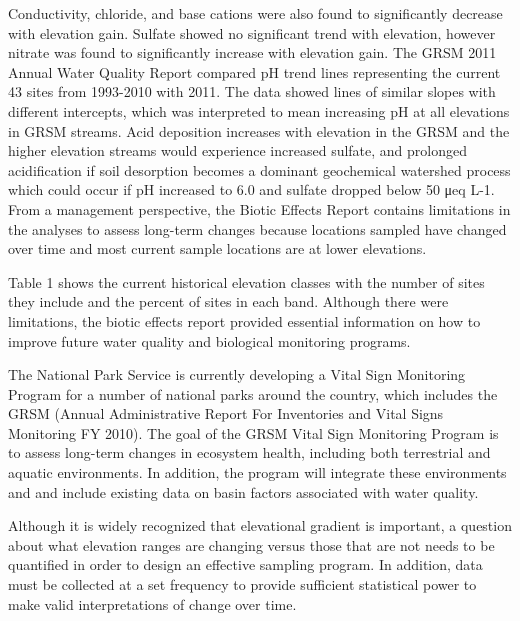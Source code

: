Conductivity, chloride, and base cations were also found to significantly decrease with elevation gain.  
Sulfate showed no significant trend with elevation, however nitrate was found to significantly increase with elevation gain.  
The GRSM 2011 Annual Water Quality Report compared pH trend lines representing the current 43 sites from 1993-2010 with 2011.  
The data showed lines of similar slopes with different intercepts, which was interpreted to mean increasing pH at all elevations in GRSM streams.  
Acid deposition increases with elevation in the GRSM and the higher elevation streams would experience increased sulfate, and prolonged acidification if soil desorption becomes a dominant geochemical watershed process which could occur if pH increased to 6.0 and sulfate dropped below 50 μeq L-1.  
From a management perspective, the Biotic Effects Report contains limitations in the analyses to assess long-term changes because locations sampled have changed over time and most current sample locations are at lower elevations.

%
Table 1 shows the current historical elevation classes with the number of sites they include and the percent of sites in each band.  
Although there were limitations, the biotic effects report provided essential information on how to improve future water quality and biological monitoring programs.

The National Park Service is currently developing a Vital Sign Monitoring Program for a number of national parks around the country, which includes the GRSM (Annual Administrative Report For Inventories and Vital Signs Monitoring FY 2010).  
The goal of the GRSM Vital Sign Monitoring Program is to assess long-term changes in ecosystem health, including both terrestrial and aquatic environments. 
In addition, the program will integrate these environments and and include existing data on basin factors associated with water quality.   

Although it is widely recognized that elevational gradient is important, a question about what elevation ranges are changing versus those that are not needs to be quantified in order to design an effective sampling program.  
In addition, data must be collected at a set frequency to provide sufficient statistical power to make valid interpretations of change over time. 

 